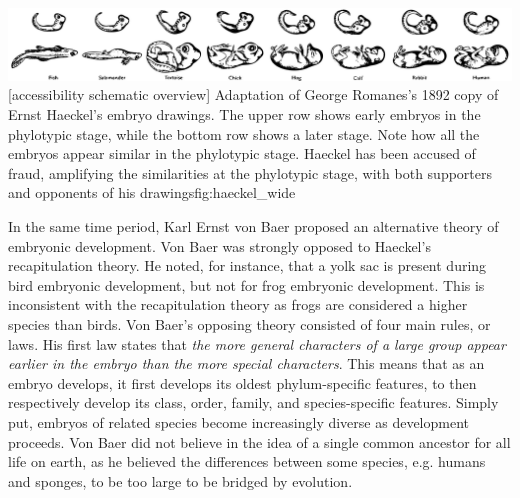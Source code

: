 {\includegraphics[width=2.2\textwidth]
{ch.introduction/imgs/haeckel_wide.png}}
[accessibility schematic overview]
{Adaptation of George Romanes's 1892 copy of Ernst Haeckel's embryo drawings. The upper row shows early embryos in the phylotypic stage, while the bottom row shows a later stage. Note how all the embryos appear similar in the phylotypic stage. Haeckel has been accused of fraud, amplifying the similarities at the phylotypic stage, with both supporters\cite{Richards2008} and opponents of his drawings\cite{Pennisi1997}}{fig:haeckel_wide}

In the same time period, Karl Ernst von Baer proposed an alternative theory of embryonic development. Von Baer was strongly opposed to Haeckel's recapitulation theory. He noted, for instance, that a yolk sac is present during bird embryonic development, but not for frog embryonic development. This is inconsistent with the recapitulation theory as frogs are considered a higher species than birds. Von Baer's opposing theory consisted of four main rules, or laws\cite{baer1828}. His first law states that \textit{the more general characters of a large group appear earlier in the embryo than the more special characters}. This means that as an embryo develops, it first develops its oldest phylum-specific features, to then respectively develop its class, order, family, and species-specific features. Simply put, embryos of related species become increasingly diverse as development proceeds. Von Baer did not believe in the idea of a single common ancestor for all life on earth, as he believed the differences between some species, e.g. humans and sponges, to be too large to be bridged by evolution.


